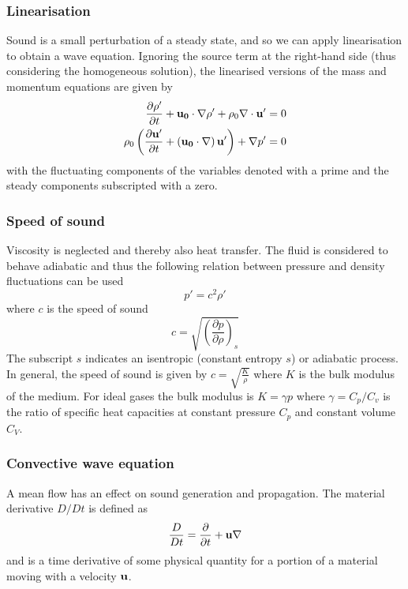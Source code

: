 \subsubsection*{Linearisation}
Sound is a small perturbation of a steady state, and so we can apply
linearisation to obtain a wave equation. Ignoring the source term at the
right-hand side (thus considering the homogeneous solution), the linearised
versions of the mass and momentum equations are given by
\begin{align}
 \frac{\partial \rho'}{\partial t} + \mathbf{u_0} \cdot \nabla \rho' + \rho_0 \nabla \cdot \mathbf{u'} = 0  \label{eq:theory:sound:linearisation:mass} \\
 \rho_0 \left( \frac{\partial \mathbf{u'}}{\partial t} + \left(\mathbf{u_0} \cdot \nabla \right) \mathbf{u'}\right) + \nabla p' = 0 \label{eq:theory:sound:linearisation:momentum}
\end{align}
with the fluctuating components of the variables denoted with a prime and the
steady components subscripted with a zero.

\subsubsection*{Speed of sound}
Viscosity is neglected and thereby also heat transfer. The fluid is considered
to behave adiabatic and thus the following relation between pressure and density
fluctuations can be used
\begin{equation}
  p' = c^2 \rho'
\end{equation}
where $c$ is the speed of sound
\begin{equation}
  c = \sqrt{ \left( \frac{\partial p}{\partial \rho} \right)_{s} }
\end{equation}
The subscript $s$ indicates an isentropic (constant entropy $s$) or adiabatic process.
In general, the speed of sound is given by $c = \sqrt{\frac{K}{\rho}}$ where $K$
is the bulk modulus of the medium. For ideal gases the bulk modulus is $K=\gamma
p$ where $\gamma=C_p/C_v$ is the ratio of specific heat capacities at constant
pressure $C_p$ and constant volume $C_V$.

\subsubsection*{Convective wave equation}
A mean flow has an effect on sound generation and propagation.
The material derivative $D/Dt$ is defined as
\begin{equation}
  \frac{D}{Dt} = \frac{\partial}{\partial t} + \mathbf{u} \nabla
\end{equation}
and is a time derivative of some physical quantity for a portion of a material
moving with a velocity $\mathbf{u}$.

